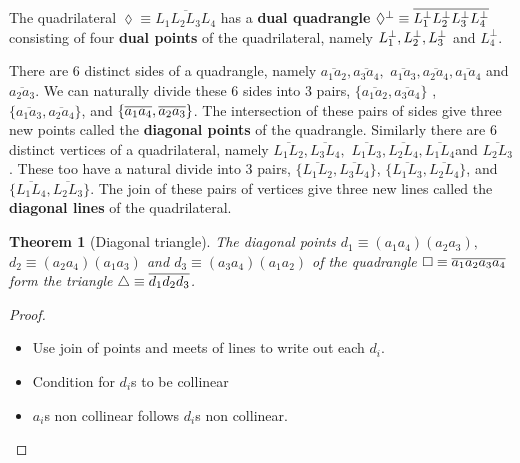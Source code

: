 \documentclass[11pt]{article}
\newtheorem{theorem}{Theorem}
\begin{document}
The quadrilateral $\lozenge\equiv \overline{L_{1}L_{2}L_{3}L_{4}}$ has a 
\textbf{dual quadrangle} $\lozenge^{\perp}\equiv\overline{%
L_{1}^{\perp}L_{2}^{\perp}L_{3}^{\perp}L_{4}^{\perp}}$ consisting of four 
\textbf{dual points} of the quadrilateral, namely $L_{1}^{\perp},L_{2}^{%
\perp},L_{3}^{\perp}$ and $L_{4}^{\perp}$.\newline

There are 6 distinct sides of a quadrangle, namely $\overline{a_{1}a_{2}},%
\overline{a_{3}a_{4}},$ $\overline{a_{1}a_{3}},\overline{a_{2}a_{4}},%
\overline{a_{1}a_{4}}$ and $\overline{a_{2}a_{3}}$. We can naturally divide
these 6 sides into 3 pairs, $\{\overline{a_{1}a_{2}},\overline{a_{3}a_{4}}\}$%
, $\{\overline{a_{1}a_{3}},\overline{a_{2}a_{4}}\}$, and $\{\overline{%
a_{1}a_{4}},\overline{a_{2}a_{3}}\}$. The intersection of these pairs of
sides give three new points called the \textbf{diagonal points} of the
quadrangle.\newline
Similarly there are 6 distinct vertices of a quadrilateral, namely $%
\overline{L_{1}L_{2}},\overline{L_{3}L_{4}},$ $\overline{L_{1}L_{3}},%
\overline{L_{2}L_{4}},\overline{L_{1}L_{4}}$and $\overline{L_{2}L_{3}}$.
These too have a natural divide into 3 pairs, $\{\overline{L_{1}L_{2}},%
\overline{L_{3}L_{4}}\}$, $\{\overline{L_{1}L_{3}},\overline{L_{2}L_{4}}\}$,
and $\{\overline{L_{1}L_{4}},\overline{L_{2}L_{3}}\}$. The join of these
pairs of vertices give three new lines called the \textbf{diagonal lines} of
the quadrilateral.\newline

\begin{theorem}[Diagonal triangle]
The diagonal points $d_{1}\equiv(a_{1}a_{4})(a_{2}a_{3}),$\newline
$d_{2}\equiv(a_{2}a_{4})(a_{1}a_{3})$ and $d_{3}%
\equiv(a_{3}a_{4})(a_{1}a_{2})$ of the quadrangle $\square\equiv\overline{%
a_{1}a_{2}a_{3}a_{4}}$ form the triangle $\triangle\equiv\overline{%
d_{1}d_{2}d_{3}}$.
\end{theorem}

\begin{proof}
\begin{itemize}
\item Use join of points and meets of lines to write out each $d_{i}$.
\item Condition for $d_{i}$s to be collinear
\item $a_{i}$s non collinear follows $d_{i}$s non collinear.
\end{itemize}
\end{proof}
\end{document}
